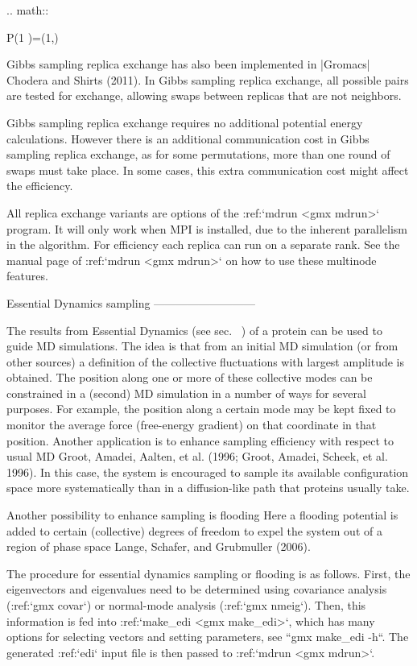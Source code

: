 .. math::

   P(1 )=\min\left(1,\exp{} \right)

Gibbs sampling replica exchange has also been implemented in
|Gromacs| Chodera and Shirts (2011). In Gibbs sampling replica exchange,
all possible pairs are tested for exchange, allowing swaps between
replicas that are not neighbors.

Gibbs sampling replica exchange requires no additional potential energy
calculations. However there is an additional communication cost in Gibbs
sampling replica exchange, as for some permutations, more than one round
of swaps must take place. In some cases, this extra communication cost
might affect the efficiency.

All replica exchange variants are options of the :ref:`mdrun <gmx mdrun>`
program. It will only work when MPI is installed, due to the inherent
parallelism in the algorithm. For efficiency each replica can run on a
separate rank. See the manual page of :ref:`mdrun <gmx mdrun>` on how to
use these multinode features.

Essential Dynamics sampling
---------------------------

The results from Essential Dynamics (see
sec. 
) of a protein can be used to guide
MD simulations. The idea is that from an initial MD simulation (or from
other sources) a definition of the collective fluctuations with largest
amplitude is obtained. The position along one or more of these
collective modes can be constrained in a (second) MD simulation in a
number of ways for several purposes. For example, the position along a
certain mode may be kept fixed to monitor the average force (free-energy
gradient) on that coordinate in that position. Another application is to
enhance sampling efficiency with respect to usual MD Groot, Amadei,
Aalten, et al. (1996; Groot, Amadei, Scheek, et al. 1996). In this case,
the system is encouraged to sample its available configuration space
more systematically than in a diffusion-like path that proteins usually
take.

Another possibility to enhance sampling is
flooding
Here a flooding potential is
added to certain (collective) degrees of freedom to expel the system out
of a region of phase space Lange, Schafer, and Grubmuller (2006).

The procedure for essential dynamics sampling or flooding is as follows.
First, the eigenvectors and eigenvalues need to be determined using
covariance analysis (:ref:`gmx covar`) or normal-mode analysis
(:ref:`gmx nmeig`). Then, this information is fed into
:ref:`make_edi <gmx make_edi>`, which has many options for selecting vectors
and setting parameters, see ``gmx make_edi -h``. The
generated :ref:`edi` input file is then passed to
:ref:`mdrun <gmx mdrun>`.

